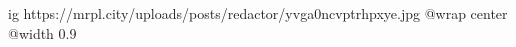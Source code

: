  
 
 
 
 

\ifcmt
  ig https://mrpl.city/uploads/posts/redactor/yvga0ncvptrhpxye.jpg
  @wrap center
  @width 0.9
\fi
